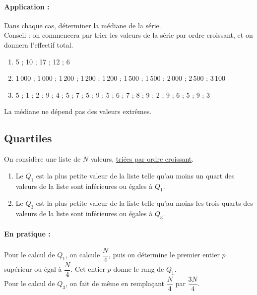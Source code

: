 \paragraph{Application :}Dans chaque cas, déterminer la médiane de la
  série.\\
  Conseil : on commencera par trier les valeurs de la série par ordre
  croissant, et on donnera l'effectif total.


\begin{enumerate}
\item 5 ; 10 ; 17 ; 12 ; 6 
\item 1\,000 ; 1\,000 ; 1\,200 ; 1\,200 ; 1\,200 ; 1\,500 ; 1\,500 ;
  2\,000 ; 2\,500 ; 3\,100 
\item 5 ; 1 ; 2 ; 9 ; 4 ; 5 ; 7 ; 5 ; 9 ; 5 ; 6 ; 7 ; 8 ; 9 ; 2 ; 9 ;
  6 ; 5 ; 9 ; 3 
\end{enumerate}

\begin{remark}
La médiane ne dépend pas des valeurs extrêmes.

    
\end{remark}



\bigskip


\subsection{Quartiles}

\begin{definition}
  On considère une liste de $N$ valeurs, \underline{triées par ordre
    croissant}. 
  \begin{enumerate}
      \item Le  $Q_1$ est la plus petite valeur de
    la liste telle qu'au moins un quart des valeurs de la liste sont
    inférieures ou égales à $Q_1$.
\item Le  $Q_3$ est la plus petite valeur de
    la liste telle qu'au moins les trois quarts des valeurs de la
    liste sont inférieures ou égales à $Q_3$.
  \end{enumerate}

    
\end{definition}

\bigskip

\paragraph{En pratique :}
  Pour le calcul de $Q_1$, on calcule $\dfrac{N}4$, puis on détermine
  le premier entier $p$ supérieur ou égal à $\dfrac{N}4$. Cet entier
  $p$ donne le rang de $Q_1$. \\
  Pour le calcul de $Q_3$, on fait de même en remplaçant $\dfrac{N}4$
  par $\dfrac{3N}4$. 


